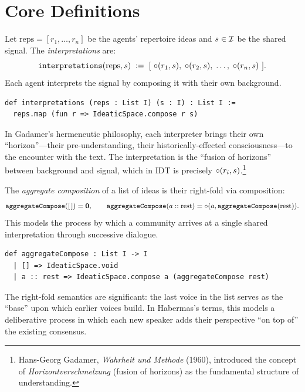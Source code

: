 \section{Core Definitions}
\label{sec:ch19-defs}

\begin{definition}[Interpretations]
\label{def:interpretations}
Let $\text{reps} = [r_1, \ldots, r_n]$ be the agents' repertoire ideas and
$s \in \mathcal{I}$ be the shared signal.  The \emph{interpretations} are:
\[
  \texttt{interpretations}(\text{reps}, s) \;:=\;
  [\ \compose(r_1, s),\; \compose(r_2, s),\; \ldots,\; \compose(r_n, s)\ ].
\]
Each agent interprets the signal by composing it with their own background.
\end{definition}

\begin{lstlisting}[caption={Interpretations in Lean}]
def interpretations (reps : List I) (s : I) : List I :=
  reps.map (fun r => IdeaticSpace.compose r s)
\end{lstlisting}

In Gadamer's hermeneutic philosophy, each interpreter brings their own
``horizon''---their pre-understanding, their historically-effected
consciousness---to the encounter with the text.  The interpretation is the
``fusion of horizons'' between background and signal, which in IDT is
precisely $\circ(r_i, s)$.\footnote{Hans-Georg Gadamer,
\textit{Wahrheit und Methode} (1960), introduced the concept of
\textit{Horizontverschmelzung} (fusion of horizons) as the fundamental
structure of understanding.}

\begin{definition}
\label{def:aggregateCompose}
The \emph{aggregate composition} of a list of ideas is their right-fold
via composition:
\[
  \texttt{aggregateCompose}([\,]) = \mathbf{0}, \qquad
  \texttt{aggregateCompose}(a :: \text{rest}) = \circ(a, \texttt{aggregateCompose}(\text{rest})).
\]
This models the process by which a community arrives at a single shared
interpretation through successive dialogue.
\end{definition}

\begin{lstlisting}[caption={Aggregate composition in Lean}]
def aggregateCompose : List I -> I
  | [] => IdeaticSpace.void
  | a :: rest => IdeaticSpace.compose a (aggregateCompose rest)
\end{lstlisting}

The right-fold semantics are significant: the last voice in the list serves
as the ``base'' upon which earlier voices build.  In Habermas's terms, this
models a deliberative process in which each new speaker adds their
perspective ``on top of'' the existing consensus.

